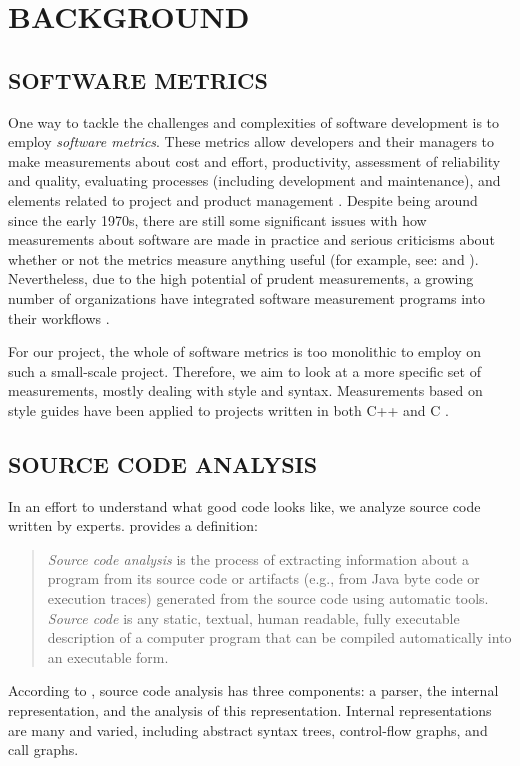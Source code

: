 \documentclass[12pt,abstracton]{scrartcl}
\begin{document}
\section{BACKGROUND}\label{sec:metric}
\subsection{SOFTWARE METRICS}
One way to tackle the challenges and complexities of software development is to employ
\emph{software metrics}. These metrics allow developers and their managers to make
measurements about cost and effort, productivity, assessment of reliability and
quality, evaluating processes (including development and maintenance), and elements
related to project and product management \cite{Ord08}. Despite being around since
the early 1970s, there are still some significant issues with how measurements
about software are made in practice and serious criticisms about whether or not the metrics
measure anything useful (for example, see: \cite{Jon94} and \cite{Bou12}).
Nevertheless, due to the high potential of prudent measurements,
a growing number of organizations have integrated software measurement programs into
their workflows \cite{Ord08}.

For our project, the whole of software metrics is too monolithic to employ on
such a small-scale project. Therefore, we aim to look at a more specific set of measurements,
mostly dealing with style and syntax. Measurements based on style guides
have been applied to projects written in both C++ \cite{Aye98} and C \cite{Tak11}.
\subsection{SOURCE CODE ANALYSIS}
In an effort to understand what good code looks like, we analyze source code
written by experts. \cite{Bin07} provides a definition:
\begin{quote}
\emph{Source code analysis} is the process of extracting
information about a program from its source code
or artifacts (e.g., from Java byte code or execution
traces) generated from the source code using automatic tools.
\emph{Source code} is any static, textual,
human readable, fully executable description of
a computer program that can be compiled automatically into an executable form.
\end{quote}

According to \cite{Bin07}, source code analysis has three components: a parser,
the internal representation, and the analysis of this representation.
Internal representations are many and varied, including abstract syntax trees,
control-flow graphs, and call graphs.
\end{document}
